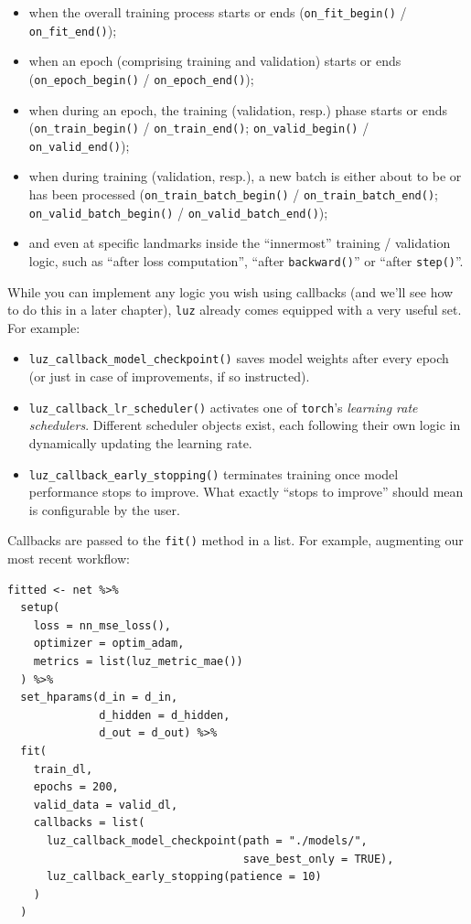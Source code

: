 \documentclass[
  letterpaper,
]{krantz}
\begin{document}
\begin{itemize}
\item
  when the overall training process starts or ends
  (\texttt{on\_fit\_begin()} / \texttt{on\_fit\_end()});
\item
  when an epoch (comprising training and validation) starts or ends
  (\texttt{on\_epoch\_begin()} / \texttt{on\_epoch\_end()});
\item
  when during an epoch, the training (validation, resp.) phase starts or
  ends (\texttt{on\_train\_begin()} / \texttt{on\_train\_end()};
  \texttt{on\_valid\_begin()} / \texttt{on\_valid\_end()});
\item
  when during training (validation, resp.), a new batch is either about
  to be or has been processed (\texttt{on\_train\_batch\_begin()} /
  \texttt{on\_train\_batch\_end()}; \texttt{on\_valid\_batch\_begin()} /
  \texttt{on\_valid\_batch\_end()});
\item
  and even at specific landmarks inside the ``innermost'' training /
  validation logic, such as ``after loss computation'', ``after
  \texttt{backward()}'' or ``after \texttt{step()}''.
\end{itemize}

While you can implement any logic you wish using callbacks (and we'll
see how to do this in a later chapter), \texttt{luz} already comes
equipped with a very useful set. For example:

\begin{itemize}
\item
  \texttt{luz\_callback\_model\_checkpoint()} saves model weights after
  every epoch (or just in case of improvements, if so instructed).
\item
  \texttt{luz\_callback\_lr\_scheduler()} activates one of
  \texttt{torch}'s \emph{learning rate schedulers}. Different scheduler
  objects exist, each following their own logic in dynamically updating
  the learning rate.
\item
  \texttt{luz\_callback\_early\_stopping()} terminates training once
  model performance stops to improve. What exactly ``stops to improve''
  should mean is configurable by the user.
\end{itemize}

Callbacks are passed to the \texttt{fit()} method in a list. For
example, augmenting our most recent workflow:

\begin{verbatim}
fitted <- net %>%
  setup(
    loss = nn_mse_loss(),
    optimizer = optim_adam,
    metrics = list(luz_metric_mae())
  ) %>%
  set_hparams(d_in = d_in,
              d_hidden = d_hidden,
              d_out = d_out) %>%
  fit(
    train_dl,
    epochs = 200,
    valid_data = valid_dl,
    callbacks = list(
      luz_callback_model_checkpoint(path = "./models/",
                                    save_best_only = TRUE),
      luz_callback_early_stopping(patience = 10)
    )
  )
\end{verbatim}
\end{document}
